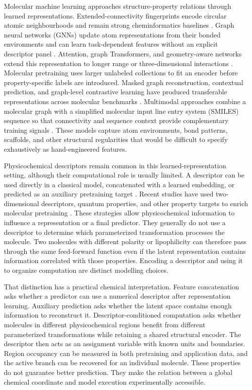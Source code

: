 \documentclass[journal=jcisd8,manuscript=article]{achemso}
\begin{document}
Molecular machine learning approaches structure-property relations through
learned representations. Extended-connectivity fingerprints encode circular
atomic neighbourhoods and remain strong cheminformatics baselines
\cite{Rogers2010}. Graph neural networks (GNNs) update atom representations from
their bonded environments and can learn task-dependent features without an
explicit descriptor panel \cite{Gilmer2017,Yang2019}. Attention, graph
Transformers, and geometry-aware networks extend this representation to longer
range or three-dimensional interactions \cite{Atz2021,Luong2024Cheminformatics}.
Molecular pretraining uses larger unlabeled collections to fit an encoder before
property-specific labels are introduced. Masked graph reconstruction,
contextual prediction, and graph-level contrastive learning have produced
transferable representations across molecular benchmarks
\cite{Hu2020,Rong2020,Wang2022,Fang2022}. Multimodal approaches combine a
molecular graph with a simplified molecular input line entry system (SMILES)
sequence so that connectivity and sequence context provide complementary
training signals \cite{Ross2022MolFormer,Shen2024MoleSG}. These models capture
atom environments, bond patterns, scaffolds, and other structural regularities
that would be difficult to specify exhaustively as hand-engineered features.

Physicochemical descriptors remain common in this learned-representation
setting, although their computational role is usually limited. A descriptor can
be used directly in a classical model, concatenated with a learned embedding, or
predicted as an auxiliary pretraining target \cite{Shen2021MolMap,Li2023}.
Recent studies have used two-dimensional descriptors, quantum properties, and
other property targets to enrich molecular pretraining
\cite{Kim2024QuantumInformed,Li2024QMDescriptors,Chang2024SPMM}. These strategies
allow physicochemical information to influence a representation or a final
predictor. They generally do not use a descriptor to determine which
parameterized transformation processes the molecule. Two molecules with
different polarity or lipophilicity can therefore pass through the same
feed-forward function even if the latent representation contains information
correlated with those properties. Encoding a descriptor and using it to
organize computation are distinct modelling choices.

That distinction has a practical chemical interpretation. Feature
concatenation asks whether a predictor can use a numerical descriptor after
representation learning. Auxiliary prediction asks whether the latent space
contains enough information to reconstruct it. Descriptor-conditioned
computation asks whether molecules in different physicochemical regions
benefit from different parameterized transformations while retaining a shared
structural encoder. The descriptor then acts as an assignment variable with
known units and boundaries. Region occupancy can be measured in both
pretraining and application data, and the active branch can be recovered for
an individual molecule. These properties do not guarantee better prediction.
They make the relation between a global chemical coordinate and model
execution experimentally accessible.
\end{document}
